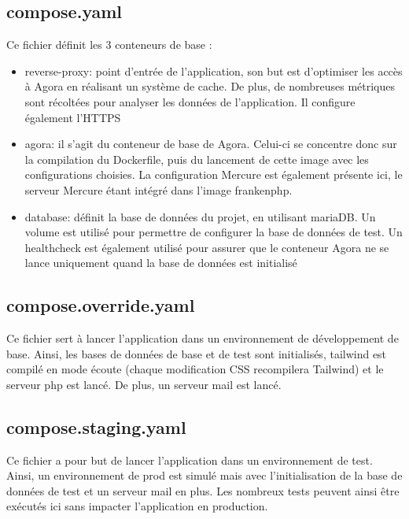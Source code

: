 \documentclass{article}
\begin{document}
        \subsection{compose.yaml}

            Ce fichier définit les 3 conteneurs de base : 
            \begin{itemize}
                \item reverse-proxy: point d'entrée de l'application, son but est d'optimiser les accès à Agora en réalisant un système de cache. De plus, de nombreuses métriques sont récoltées pour analyser les données de l'application. Il configure également l'HTTPS
                \item agora: il s'agit du conteneur de base de Agora. Celui-ci se concentre donc sur la compilation du Dockerfile, puis du lancement de cette image avec les configurations choisies. La configuration Mercure est également présente ici, le serveur Mercure étant intégré dans l'image frankenphp.
                \item database: définit la base de données du projet, en utilisant mariaDB. Un volume est utilisé pour permettre de configurer la base de données de test. Un healthcheck est également utilisé pour assurer que le conteneur Agora ne se lance uniquement quand la base de données est initialisé
            \end{itemize}

        \subsection{compose.override.yaml}

            Ce fichier sert à lancer l'application dans un environnement de développement de base. Ainsi, les bases de données de base et de test sont initialisés, tailwind est compilé en mode écoute (chaque modification CSS recompilera Tailwind) et le serveur php est lancé. De plus, un serveur mail est lancé.

        \subsection{compose.staging.yaml}

            Ce fichier a pour but de lancer l'application dans un environnement de test. Ainsi, un environnement de prod est simulé mais avec l'initialisation de la base de données de test et un serveur mail en plus. Les nombreux tests peuvent ainsi être exécutés ici sans impacter l'application en production.
\end{document}
